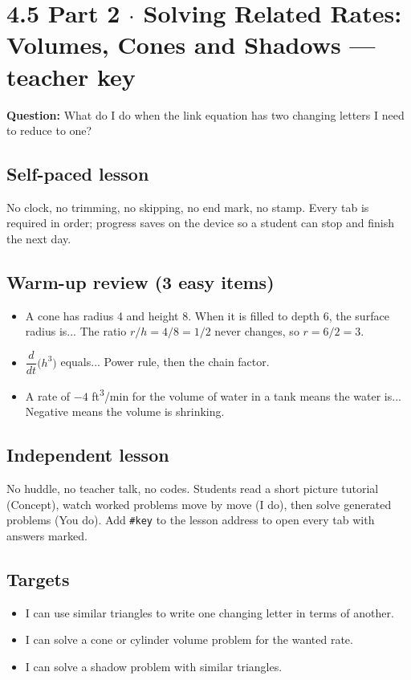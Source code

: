 \documentclass[11pt]{article}
\begin{document}
\section*{4.5 Part 2 $\cdot$ Solving Related Rates: Volumes, Cones and Shadows --- teacher key}
\textbf{Question:} What do I do when the link equation has two changing letters I need to reduce to one?\par
\subsection*{Self-paced lesson}No clock, no trimming, no skipping, no end mark, no stamp. Every tab is required in order; progress saves on the device so a student can stop and finish the next day.\par
\subsection*{Warm-up review (3 easy items)}\begin{itemize}
\item A cone has radius 4 and height 8. When it is filled to depth 6, the surface radius is...  The ratio $r/h=4/8=1/2$ never changes, so $r=6/2=3$.
\item $\dfrac{d}{dt}\bigl(h^3\bigr)$ equals...  Power rule, then the chain factor.
\item A rate of $-4$ ft\textsuperscript{3}/min for the volume of water in a tank means the water is...  Negative means the volume is shrinking.
\end{itemize}
\subsection*{Independent lesson}No huddle, no teacher talk, no codes. Students read a short picture tutorial (Concept), watch worked problems move by move (I do), then solve generated problems (You do). Add \texttt{\#key} to the lesson address to open every tab with answers marked.\par
\subsection*{Targets}\begin{itemize}\item I can use similar triangles to write one changing letter in terms of another.
\item I can solve a cone or cylinder volume problem for the wanted rate.
\item I can solve a shadow problem with similar triangles.\end{itemize}
\end{document}
